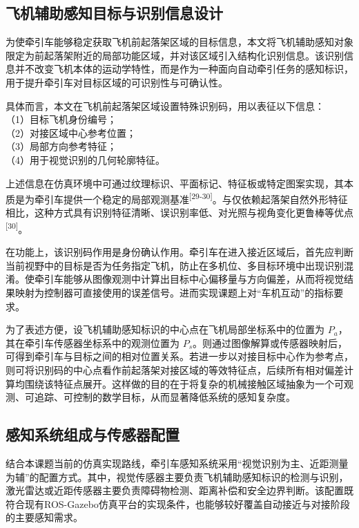 \subsection{飞机辅助感知目标与识别信息设计}

为使牵引车能够稳定获取飞机前起落架区域的目标信息，本文将飞机辅助感知对象限定为前起落架附近的局部功能区域，并对该区域引入结构化识别信息。该识别信息并不改变飞机本体的运动学特性，而是作为一种面向自动牵引任务的感知标识，用于提升牵引车对目标区域的可识别性与可确认性。

具体而言，本文在飞机前起落架区域设置特殊识别码，用以表征以下信息：\\
（1）目标飞机身份编号；\\
（2）对接区域中心参考位置；\\
（3）局部方向参考特征；\\
（4）用于视觉识别的几何轮廓特征。

上述信息在仿真环境中可通过纹理标识、平面标记、特征板或特定图案实现，其本质是为牵引车提供一个稳定的局部观测基准\textsuperscript{[29-30]}。与仅依赖起落架自然外形特征相比，这种方式具有识别特征清晰、误识别率低、对光照与视角变化更鲁棒等优点\textsuperscript{[30]}。

在功能上，该识别码作用是身份确认作用。牵引车在进入接近区域后，首先应判断当前视野中的目标是否为任务指定飞机，防止在多机位、多目标环境中出现识别混淆。使牵引车能够从图像观测中计算出目标中心偏移量与方向偏差，从而将视觉结果映射为控制器可直接使用的误差信号。进而实现课题上对``车机互动''的指标要求。

为了表述方便，设飞机辅助感知标识的中心点在飞机局部坐标系中的位置为
\(P_{a}\)，其在牵引车传感器坐标系中的观测位置为
\(P_{s}\)。则通过图像解算或传感器映射后，可得到牵引车与目标之间的相对位置关系。若进一步以对接目标中心作为参考点，则可将识别码的中心点看作前起落架对接区域的等效特征点，后续所有相对偏差计算均围绕该特征点展开。这样做的目的在于将复杂的机械接触区域抽象为一个可观测、可追踪、可控制的数学目标，从而显著降低系统的感知复杂度。

\subsection{感知系统组成与传感器配置}

结合本课题当前的仿真实现路线，牵引车感知系统采用``视觉识别为主、近距测量为辅''的配置方式。其中，视觉传感器主要负责飞机辅助感知标识的检测与识别，激光雷达或近距传感器主要负责障碍物检测、距离补偿和安全边界判断。该配置既符合现有ROS-Gazebo仿真平台的实现条件，也能够较好覆盖自动接近与对接阶段的主要感知需求。


